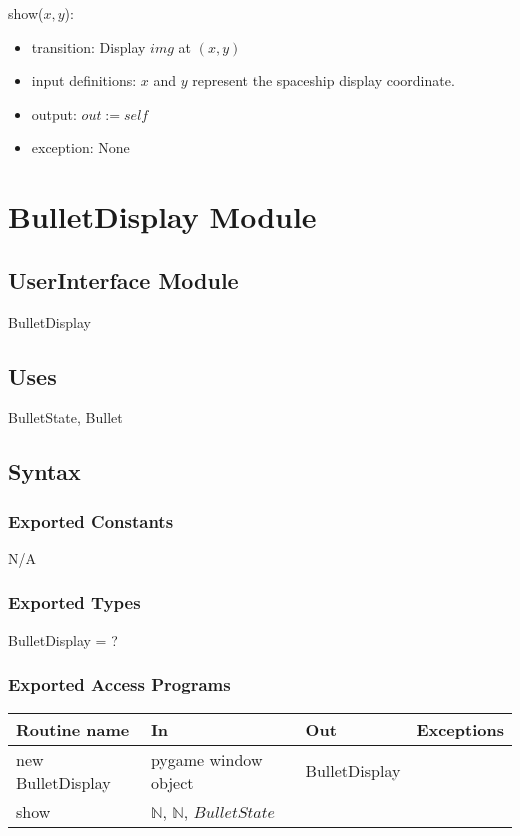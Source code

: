 \documentclass[12pt]{article}
\begin{document}
\noindent show($x, y$):
\begin{itemize}
    \item transition: Display $img$ at $(x, y)$
    \item input definitions: $x$ and $y$ represent the spaceship display coordinate.
     \item output: $out := self$
    \item exception: None
\end{itemize}
\newpage

\section{BulletDisplay Module}

\subsection*{UserInterface Module}
BulletDisplay
\subsection*{Uses}
BulletState, Bullet

\subsection*{Syntax}
\subsubsection*{Exported Constants}
N/A
\subsubsection*{Exported Types}
BulletDisplay = ?

\subsubsection*{Exported Access Programs}

\begin{tabular}{| l | l | l | l |}
\hline
\textbf{Routine name} & \textbf{In} & \textbf{Out} & \textbf{Exceptions}\\
\hline
new BulletDisplay       &pygame window object&     BulletDisplay        &           \\
\hline
show       &	$\mathbb{N}$, $\mathbb{N}$, $BulletState$     &           &          \\
\hline
\end{tabular}
\end{document}
